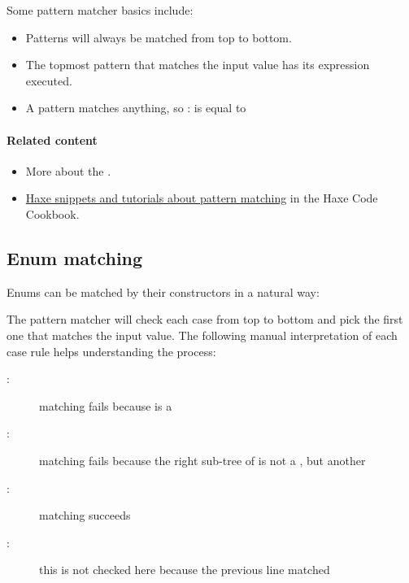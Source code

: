 
Some pattern matcher basics include:

\begin{itemize}
	\item Patterns will always be matched from top to bottom.
	\item The topmost pattern that matches the input value has its expression executed.
	\item A \expr{_} pattern matches anything, so : is equal to 
\end{itemize}

\paragraph{Related content}
\begin{itemize}
	\item More about the .
	\item \href{http://code.haxe.org/tag/pattern-matching.html}{Haxe snippets and tutorials about pattern matching} in the Haxe Code Cookbook.
\end{itemize} 

\subsection{Enum matching}
\label{lf-pattern-matching-enums}

Enums can be matched by their constructors in a natural way:


The pattern matcher will check each case from top to bottom and pick the first one that matches the input value. The following manual interpretation of each case rule helps understanding the process:

\begin{description}
	\item[:] matching fails because  is a 
	\item[:] matching fails because the right sub-tree of  is not a , but another 
	\item[:] matching succeeds
	\item[:] this is not checked here because the previous line matched
\end{description}

